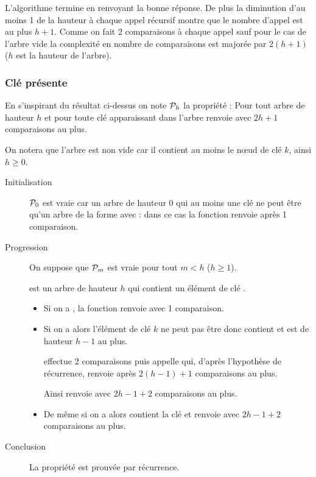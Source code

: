 L'algorithme termine en renvoyant la bonne réponse. De plus la diminution  d'au moins 1 de la hauteur à chaque appel récursif montre que le nombre d'appel est au plus $h+1$. Comme on fait 2 comparaisons à chaque appel sauf pour le cas de l'arbre vide la complexité en nombre de comparaisons est majorée par $2(h+1)$ ($h$ est la hauteur de l'arbre).
\newpage
\subsubsection{Clé présente}
 En s'inspirant du résultat ci-dessus on note ${\cal P}_h$ la propriété :
{Pour tout arbre  de hauteur $h$ et pour toute clé  apparaissant dans l'arbre 
 renvoie  avec $2h+1$ comparaisons au plus.}

On notera que l'arbre est non vide car il contient au moins le nœud de clé $k$, ainsi $h\ge 0$.

\begin{description}
\item[Initialisation] ${\cal P}_0$ est vraie car un arbre de hauteur 0 qui au moins une clé ne peut être qu'un arbre de la forme 
  avec  :  dans ce cas la fonction renvoie  après 1 comparaison.

\item[Progression] On suppose que  ${\cal P}_m$ est vraie pour tout $m< h$ ($h\ge 1$). 

 est un arbre de hauteur $h$ qui contient  un élément de clé .

\begin{itemize}
\item Si on a , la fonction  renvoie  avec 1 comparaison.

\item Si on a  alors l'élément de clé $k$ ne peut pas être  donc  contient  et est de hauteur $h-1$ au plus.

  effectue 2 comparaisons puis appelle  qui, d'après l'hypothèse de récurrence, renvoie  après $2(h-1)+1$ comparaisons au plus. 
 
 Ainsi  renvoie  avec $2h-1+2$ comparaisons au plus.
 
\item De même si on a  alors  contient la clé   et  renvoie  avec $2h-1+2$ comparaisons au plus.
\end{itemize}
\item[Conclusion] La propriété est prouvée par récurrence.

\end{description}

